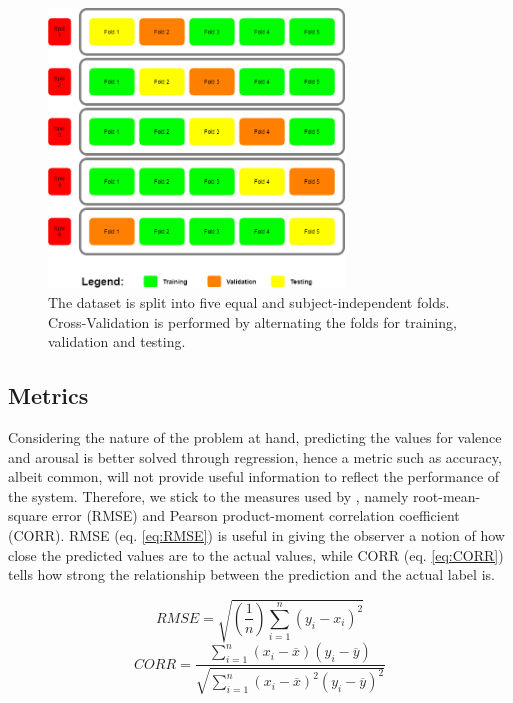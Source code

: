 \begin{figure}[H]
  \begin{center}
  \includegraphics[angle=0, width=0.7\textwidth]{Figures/CrossValSplit.png}
  \caption{The dataset is split into five equal and subject-independent folds. Cross-Validation is performed by alternating the folds for training, validation and testing.}
  \label{fig:CrossValidationSplit}
  \end{center}
\end{figure}

\subsection{Metrics}
Considering the nature of the problem at hand, predicting the values for valence and arousal is better solved through regression, hence a metric such as accuracy, albeit common, will not provide useful information to reflect the performance of the system. Therefore, we stick to the measures used by \citet{Kossaifi:2017:AFEW-VADatabase}, namely root-mean-square error (RMSE) and Pearson product-moment correlation coefficient (CORR). 
\newline\newline
RMSE (eq. \ref{eq:RMSE}) is useful in giving the observer a notion of how close the predicted values are to the actual values, while CORR (eq. \ref{eq:CORR}) tells how strong the relationship between the prediction and the actual label is. \citep{2020:RMSE} \citep{2020:PearsonCorrelation}
  
\begin{equation} \label{eq:RMSE}
RMSE = \sqrt{(\frac{1}{n})\sum_{i=1}^{n}(y_{i} - x_{i})^{2}}
\end{equation}
\newline\newline
\begin{equation} \label{eq:CORR}
CORR = \frac{{}\sum_{i=1}^{n} (x_i - \overline{x})(y_i - \overline{y})}
{\sqrt{\sum_{i=1}^{n} (x_i - \overline{x})^2(y_i - \overline{y})^2}}
\end{equation}

